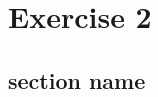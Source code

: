 \graphicspath{{Chapters/Exercise2/}}

\chapter{Exercise 2}

\section{section name} %
\label{sec:section_name}

